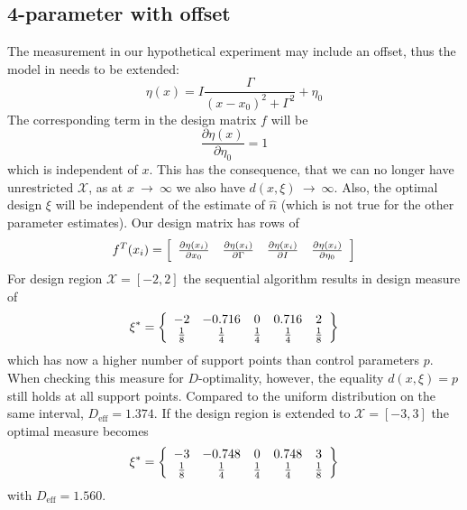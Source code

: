 \documentclass[12pt]{iopart}
\begin{document}
\subsection{4-parameter with offset}
\label{sec:4param}

The measurement in our hypothetical experiment may include an offset, thus the model in  needs to be extended:
\begin{equation}
\eta(x) = I \frac{\Gamma}{(x - x_0)^2 + \Gamma^2} + \eta_0
\label{eq:lorentz4}
\end{equation}
The corresponding term in the design matrix $f$ will be
\begin{equation}
\frac{\partial \eta(x)}{\partial \eta_0} = 1
\end{equation}
which is independent of $x$. This has the consequence, that we can no longer have unrestricted $\mathcal{X}$, as at $x~\rightarrow~\infty$ we also have $d(x,\xi)~\rightarrow~\infty$. Also, the optimal design $\xi$ will be independent of the estimate of $\hat n$ (which is not true for the other parameter estimates). Our design matrix has rows of
\begin{equation}
 f^T(x_i) = \left[
  \begin{array}{l l l l}
   \frac{\partial \eta(x_i)}{\partial x_0} & \frac{\partial \eta(x_i)}{\partial \Gamma} & \frac{\partial \eta(x_i)}{\partial I} & \frac{\partial \eta(x_i)}{\partial \eta_0}
  \end{array} \right ]
\end{equation}
For design region $\mathcal{X} = [-2, 2]$ the sequential algorithm results in design measure of
\begin{equation}
\xi^* = \left\{
  \begin{array}{c c c c c}
    -2 & -0.716 & 0 & 0.716 & 2\\
    \frac{1}{8} & \frac{1}{4} & \frac{1}{4} & \frac{1}{4} & \frac{1}{8}\\
  \end{array} \right \}
\end{equation}
which has now a higher number of support points than control parameters $p$. When checking this measure for $D$-optimality, however, the equality $d(x, \xi) = p$ still holds at all support points. Compared to the uniform distribution on the same interval, $D_\mathrm{eff} = 1.374$. If the design region is extended to $\mathcal{X} = [-3, 3]$ the optimal measure becomes
\begin{equation}
\xi^* = \left\{
  \begin{array}{c c c c c}
    -3 & -0.748 & 0 & 0.748 & 3\\
    \frac{1}{8} & \frac{1}{4} & \frac{1}{4} & \frac{1}{4} & \frac{1}{8}\\
  \end{array} \right \}
\end{equation}
with $D_\mathrm{eff} = 1.560$.
\end{document}
